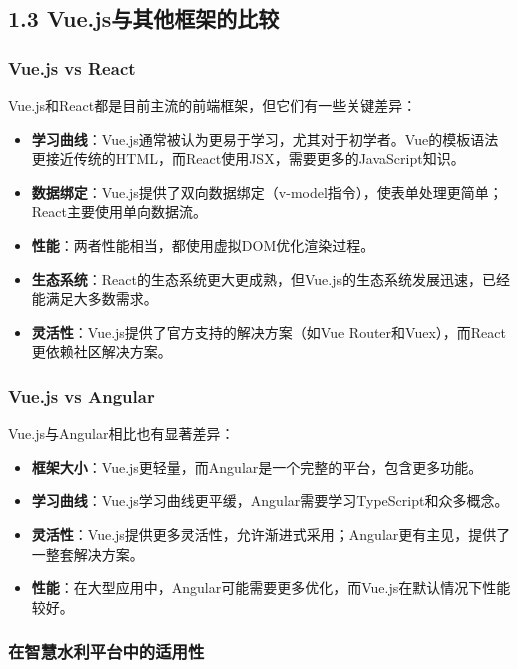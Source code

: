 \subsection{1.3
Vue.js与其他框架的比较}\label{vue.jsux4e0eux5176ux4ed6ux6846ux67b6ux7684ux6bd4ux8f83}

\subsubsection{Vue.js vs React}\label{vue.js-vs-react}

Vue.js和React都是目前主流的前端框架，但它们有一些关键差异：

\begin{itemize}
\tightlist
\item
  \textbf{学习曲线}：Vue.js通常被认为更易于学习，尤其对于初学者。Vue的模板语法更接近传统的HTML，而React使用JSX，需要更多的JavaScript知识。
\item
  \textbf{数据绑定}：Vue.js提供了双向数据绑定（v-model指令），使表单处理更简单；React主要使用单向数据流。
\item
  \textbf{性能}：两者性能相当，都使用虚拟DOM优化渲染过程。
\item
  \textbf{生态系统}：React的生态系统更大更成熟，但Vue.js的生态系统发展迅速，已经能满足大多数需求。
\item
  \textbf{灵活性}：Vue.js提供了官方支持的解决方案（如Vue
  Router和Vuex），而React更依赖社区解决方案。
\end{itemize}

\subsubsection{Vue.js vs Angular}\label{vue.js-vs-angular}

Vue.js与Angular相比也有显著差异：

\begin{itemize}
\tightlist
\item
  \textbf{框架大小}：Vue.js更轻量，而Angular是一个完整的平台，包含更多功能。
\item
  \textbf{学习曲线}：Vue.js学习曲线更平缓，Angular需要学习TypeScript和众多概念。
\item
  \textbf{灵活性}：Vue.js提供更多灵活性，允许渐进式采用；Angular更有主见，提供了一整套解决方案。
\item
  \textbf{性能}：在大型应用中，Angular可能需要更多优化，而Vue.js在默认情况下性能较好。
\end{itemize}

\subsubsection{在智慧水利平台中的适用性}\label{ux5728ux667aux6167ux6c34ux5229ux5e73ux53f0ux4e2dux7684ux9002ux7528ux6027}

